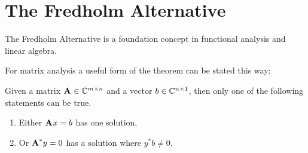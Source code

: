 \section{The Fredholm Alternative}
The Fredholm Alternative is a foundation concept in functional analysis and linear algebra.

For matrix analysis a useful form of the theorem can be stated this way:

Given a matrix $\textbf{A}^{\mathrm{}}\in\mathbb{C}^{m \times n}$ and a vector $b\in\mathbb{C}^{n \times 1}$, then only one of the following statements can be true.
\begin{enumerate}
\item Either $\textbf{A}^{\mathrm{}} x = b$ has one solution,
\item Or $\textbf{A}^{\mathrm{*}}y=0$ has a solution where $y^{*}b\ne0$. 
\end{enumerate}

\endinput